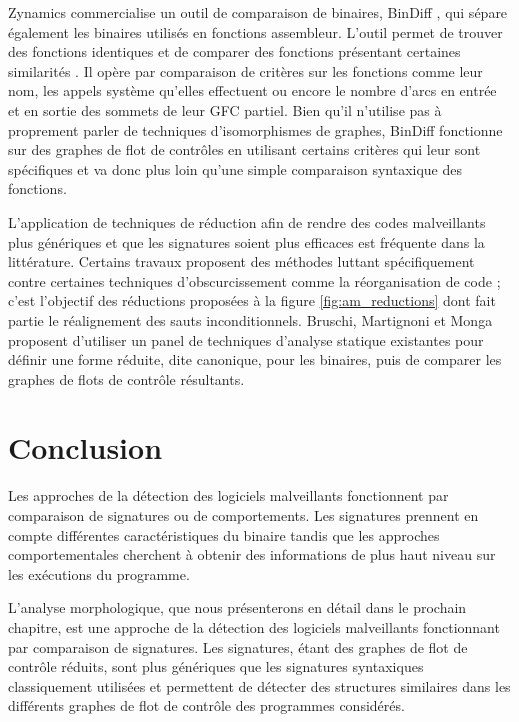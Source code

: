 Zynamics commercialise un outil de comparaison de binaires, BinDiff \cite{bindiff}, qui sépare également les binaires utilisés en fonctions assembleur.
L'outil permet de trouver des fonctions identiques et de comparer des fonctions présentant certaines similarités \cite{DR05}.
Il opère par comparaison de critères sur les fonctions comme leur nom, les appels système qu'elles effectuent ou encore le nombre d'arcs en entrée et en sortie des sommets de leur GFC partiel. Bien qu'il n'utilise pas à proprement parler de techniques d'isomorphismes de graphes, BinDiff fonctionne sur des graphes de flot de contrôles en utilisant certains critères qui leur sont spécifiques et va donc plus loin qu'une simple comparaison syntaxique des fonctions.

L'application de techniques de réduction afin de rendre des codes malveillants plus génériques et que les signatures soient plus efficaces est fréquente dans la littérature. 
Certains travaux \cite{CKJKVM05} proposent des méthodes luttant spécifiquement contre certaines techniques d'obscurcissement comme la réorganisation de code ; c'est l'objectif des réductions proposées à la figure \ref{fig:am_reductions} dont fait partie le réalignement des sauts inconditionnels.
Bruschi, Martignoni et Monga \cite{BMM06} proposent d'utiliser un panel de techniques d'analyse statique existantes pour définir une forme réduite, dite canonique, pour les binaires, puis de comparer les graphes de flots de contrôle résultants.

\section{Conclusion}
Les approches de la détection des logiciels malveillants fonctionnent par comparaison de signatures ou de comportements.
Les signatures prennent en compte différentes caractéristiques du binaire tandis que les approches comportementales cherchent à obtenir des informations de plus haut niveau sur les exécutions du programme.

L'analyse morphologique, que nous présenterons en détail dans le prochain chapitre, est une approche de la détection des logiciels malveillants fonctionnant par comparaison de signatures.
Les signatures, étant des graphes de flot de contrôle réduits, sont plus génériques que les signatures syntaxiques classiquement utilisées et permettent de détecter des structures similaires dans les différents graphes de flot de contrôle des programmes considérés.